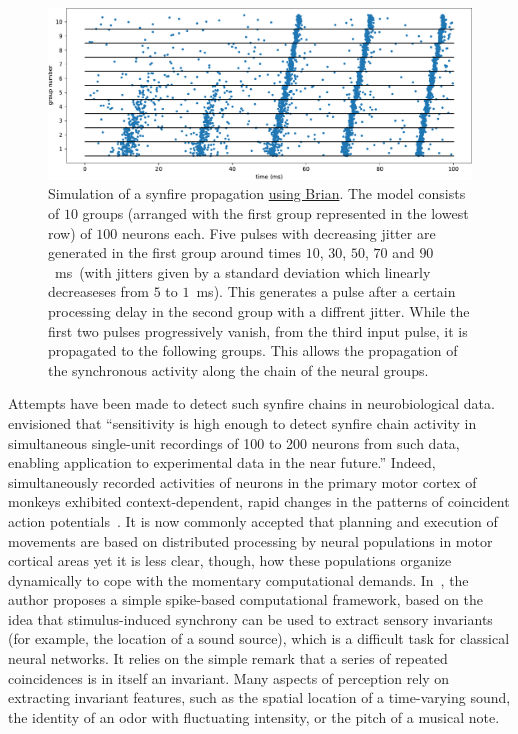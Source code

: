 \documentclass[brainsci, %
               review,submit,pdftex,moreauthors
               ]{Definitions/mdpi}
\newcommand{\ms}{\si{\milli\second}}%
\begin{document}
\begin{figure}
\centering
\includegraphics[width=\textwidth]{figures/Diesmann_et_al_1999.pdf}
\caption{Simulation of a synfire propagation \href{https://brian2.readthedocs.io/en/stable/examples/frompapers.Diesmann_et_al_1999.html}{using Brian}. The model consists of $10$ groups (arranged with the first group represented in the lowest row) of $100$ neurons each. Five pulses with decreasing jitter are generated in the first group around times $10$, $30$, $50$, $70$ and $90$~\ms~(with jitters given by a standard deviation which linearly decreaseses from $5$ to $1$~\ms). This generates a pulse after a certain processing delay in the second group with a diffrent jitter. While the first two pulses progressively vanish, from the third input pulse, it is propagated to the following groups. This allows the propagation of the synchronous activity along the chain of the neural groups.}\label{fig:diesman}
\end{figure}

Attempts have been made to detect such synfire chains in neurobiological data.~\citet{schrader_detecting_2008} envisioned that ``sensitivity is high enough to detect synfire chain activity in simultaneous single-unit recordings of 100 to 200 neurons from such data, enabling application to experimental data in the near future.'' Indeed, simultaneously recorded activities of neurons in the primary motor cortex of monkeys exhibited context-dependent, rapid changes in the patterns of coincident action potentials~\citep{riehle_spike_1997,grammont_precise_1999}. It is now commonly accepted that planning and execution of movements are based on distributed processing by neural populations in motor cortical areas yet it is less clear, though, how these populations organize dynamically to cope with the momentary computational demands.  In~\citep{brette_computing_2012}, the author proposes a simple spike-based computational framework, based on the idea that stimulus-induced synchrony can be used to extract sensory invariants (for example, the location of a sound source), which is a difficult task for classical neural networks. It relies on the simple remark that a series of repeated coincidences is in itself an invariant. Many aspects of perception rely on extracting invariant features, such as the spatial location of a time-varying sound, the identity of an odor with fluctuating intensity, or the pitch of a musical note.
\end{document}
